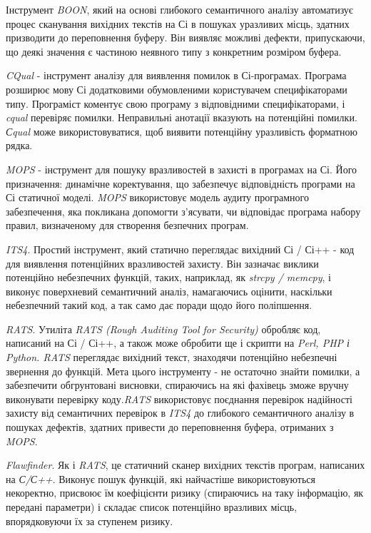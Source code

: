 Інструмент {\it BOON}, який на основі глибокого семантичного аналізу автоматизує процес сканування вихідних текстів на Сі в пошуках уразливих місць, здатних призводити до переповнення буферу. Він виявляє можливі дефекти, припускаючи, що деякі значення є частиною неявного типу з конкретним розміром буфера.

{\it CQual} - інструмент аналізу для виявлення помилок в Сі-програмах. Програма розширює мову Сі додатковими обумовленими користувачем специфікаторами типу. Програміст коментує свою програму з відповідними специфікаторами, і {\it cqual} перевіряє помилки. Неправильні анотації вказують на потенційні помилки. {\it Сqual} може використовуватися, щоб виявити потенційну уразливість форматною рядка.

{\it MOPS} - інструмент для пошуку вразливостей в захисті в програмах на Сі. Його призначення: динамічне коректування, що забезпечує відповідність програми на Сі статичної моделі. {\it MOPS} використовує модель аудиту програмного забезпечення, яка покликана допомогти з'ясувати, чи відповідає програма набору правил, визначеному для створення безпечних програм.

{\it ITS4}. Простий інструмент, який статично переглядає вихідний Сі / Сі++ - код для виявлення потенційних вразливостей захисту. Він зазначає виклики потенційно небезпечних функцій, таких, наприклад, як {\it strcpy / memcpy}, і виконує поверхневий семантичний аналіз, намагаючись оцінити, наскільки небезпечний такий код, а так само дає поради щодо його поліпшення.

{\it RATS}. Утиліта {\it RATS (Rough Auditing Tool for Security)} обробляє код, написаний на Сі / Сі++, а також може обробити ще і скрипти на {\it Perl, PHP і Python. RATS} переглядає вихідний текст, знаходячи потенційно небезпечні звернення до функцій. Мета цього інструменту - не остаточно знайти помилки, а забезпечити обгрунтовані висновки, спираючись на які фахівець зможе вручну виконувати перевірку коду.{\it RATS} використовує поєднання перевірок надійності захисту від семантичних перевірок в {\it ITS4} до глибокого семантичного аналізу в пошуках дефектів, здатних привести до переповнення буфера, отриманих з {\it MOPS}.

{\it Flawfinder}. Як і {\it RATS}, це статичний сканер вихідних текстів програм, написаних на {\it С/С++}. Виконує пошук функцій, які найчастіше використовуються некоректно, присвоює їм коефіцієнти ризику (спираючись на таку інформацію, як передані параметри) і складає список потенційно вразливих місць, впорядковуючи їх за ступенем ризику.

